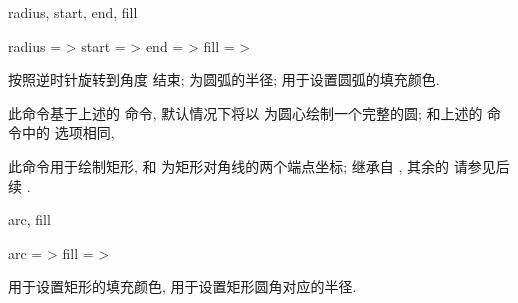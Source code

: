 \documentclass[
  hyper, lang=cn, 
  class=l3dox, 
]{../../zlatex/code/ztex}
\begin{document}
\begin{keyval}[parent=ztool/../zarc]{radius, start, end, fill}
  \begin{syntax}
    radius = >
    start  = >
    end    = >
    fill   = >
  \end{syntax}
   按照逆时针旋转到角度  结束;  为圆弧的半径;
   用于设置圆弧的填充颜色.
\end{keyval}


\begin{function}[added=2025-05-13]{\zcircle}
  \begin{syntax}
  \end{syntax}
  此命令基于上述的  命令, 默认情况下将以 \texttt{} 为圆心绘制一个完整的圆;
   和上述的  命令中的  选项相同,
\end{function}


\begin{function}[added=2025-05-13]{\zrectangle}
  \begin{syntax}
  \end{syntax}
  此命令用于绘制矩形, \texttt{} 和 \texttt{} 为矩形对角线的两个端点坐标;
   继承自 , 其余的  
  请参见后续 .
\end{function}


\begin{keyval}[parent=ztool/../zrectangle]{arc, fill}
  \begin{syntax}
    arc  = >
    fill = >
  \end{syntax}
   用于设置矩形的填充颜色,  用于设置矩形圆角对应的半径.
\end{keyval}
\end{document}
